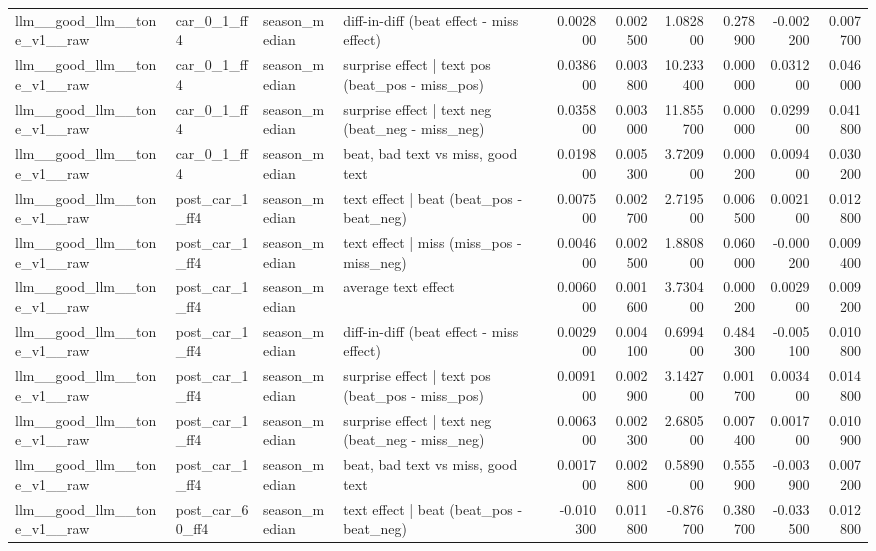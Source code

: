 \begin{table}
\begin{tabular}{llllrrrrrr}
llm\_\_good\_llm\_\_tone\_v1\_\_raw & car\_0\_1\_ff4 & season\_median & diff-in-diff (beat effect - miss effect) & 0.002800 & 0.002500 & 1.082800 & 0.278900 & -0.002200 & 0.007700 \\
llm\_\_good\_llm\_\_tone\_v1\_\_raw & car\_0\_1\_ff4 & season\_median & surprise effect | text pos (beat\_pos - miss\_pos) & 0.038600 & 0.003800 & 10.233400 & 0.000000 & 0.031200 & 0.046000 \\
llm\_\_good\_llm\_\_tone\_v1\_\_raw & car\_0\_1\_ff4 & season\_median & surprise effect | text neg (beat\_neg - miss\_neg) & 0.035800 & 0.003000 & 11.855700 & 0.000000 & 0.029900 & 0.041800 \\
llm\_\_good\_llm\_\_tone\_v1\_\_raw & car\_0\_1\_ff4 & season\_median & beat, bad text vs miss, good text & 0.019800 & 0.005300 & 3.720900 & 0.000200 & 0.009400 & 0.030200 \\
llm\_\_good\_llm\_\_tone\_v1\_\_raw & post\_car\_1\_ff4 & season\_median & text effect | beat  (beat\_pos - beat\_neg) & 0.007500 & 0.002700 & 2.719500 & 0.006500 & 0.002100 & 0.012800 \\
llm\_\_good\_llm\_\_tone\_v1\_\_raw & post\_car\_1\_ff4 & season\_median & text effect | miss  (miss\_pos - miss\_neg) & 0.004600 & 0.002500 & 1.880800 & 0.060000 & -0.000200 & 0.009400 \\
llm\_\_good\_llm\_\_tone\_v1\_\_raw & post\_car\_1\_ff4 & season\_median & average text effect & 0.006000 & 0.001600 & 3.730400 & 0.000200 & 0.002900 & 0.009200 \\
llm\_\_good\_llm\_\_tone\_v1\_\_raw & post\_car\_1\_ff4 & season\_median & diff-in-diff (beat effect - miss effect) & 0.002900 & 0.004100 & 0.699400 & 0.484300 & -0.005100 & 0.010800 \\
llm\_\_good\_llm\_\_tone\_v1\_\_raw & post\_car\_1\_ff4 & season\_median & surprise effect | text pos (beat\_pos - miss\_pos) & 0.009100 & 0.002900 & 3.142700 & 0.001700 & 0.003400 & 0.014800 \\
llm\_\_good\_llm\_\_tone\_v1\_\_raw & post\_car\_1\_ff4 & season\_median & surprise effect | text neg (beat\_neg - miss\_neg) & 0.006300 & 0.002300 & 2.680500 & 0.007400 & 0.001700 & 0.010900 \\
llm\_\_good\_llm\_\_tone\_v1\_\_raw & post\_car\_1\_ff4 & season\_median & beat, bad text vs miss, good text & 0.001700 & 0.002800 & 0.589000 & 0.555900 & -0.003900 & 0.007200 \\
llm\_\_good\_llm\_\_tone\_v1\_\_raw & post\_car\_60\_ff4 & season\_median & text effect | beat  (beat\_pos - beat\_neg) & -0.010300 & 0.011800 & -0.876700 & 0.380700 & -0.033500 & 0.012800 \\

\end{tabular}
\end{table}
